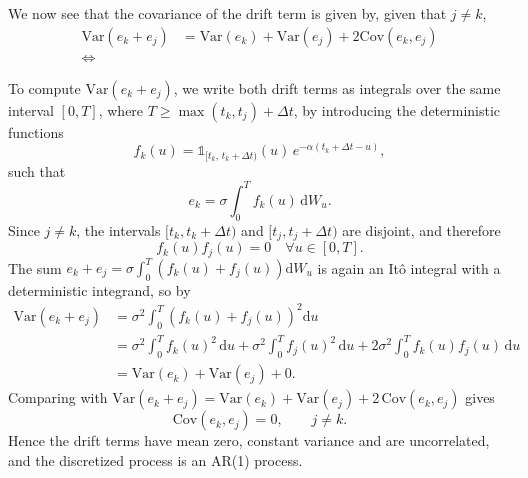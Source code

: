 We now see that the covariance of the drift term is given by, 
given that $j \neq k$,
\begin{equation}
\begin{aligned}
      \text{Var}(e_k + e_j) &= \text{Var}(e_k) +  \text{Var}(e_j) + 2\text{Cov}(e_k, e_j) \\
      \Leftrightarrow 
\end{aligned}
\end{equation}



To compute $\text{Var}(e_k + e_j)$, we write both drift terms as integrals over
the same interval $[0, T]$, where $T \geq \max(t_k, t_j) + \Delta t$, by
introducing the deterministic functions
\begin{equation}
    f_k(u) = \mathbb{1}_{[t_k,\, t_k + \Delta t)}(u)\, e^{-\alpha (t_k + \Delta t - u)},
\end{equation}
such that
\begin{equation}
    e_k = \sigma \int_0^T f_k(u) \, \mathrm{d}W_u .
\end{equation}
Since $j \neq k$, the intervals $[t_k, t_k + \Delta t)$ and $[t_j, t_j + \Delta t)$
are disjoint, and therefore
\begin{equation}
    f_k(u) f_j(u) = 0 \quad \forall u \in [0, T].
\end{equation}
The sum $e_k + e_j = \sigma \int_0^T \left(f_k(u) + f_j(u)\right) \mathrm{d}W_u$
is again an Itô integral with a deterministic integrand, so by
\textcite[Thm.~1.9.1]{iacus2008}
\begin{equation}
\begin{aligned}
    \text{Var}(e_k + e_j)
    &= \sigma^2 \int_0^T \left(f_k(u) + f_j(u)\right)^2 \mathrm{d}u \\
    &= \sigma^2 \int_0^T f_k(u)^2 \, \mathrm{d}u
     + \sigma^2 \int_0^T f_j(u)^2 \, \mathrm{d}u
     + 2\sigma^2 \int_0^T f_k(u) f_j(u) \, \mathrm{d}u \\
    &= \text{Var}(e_k) + \text{Var}(e_j) + 0 .
\end{aligned}
\end{equation}
Comparing with
$\text{Var}(e_k + e_j) = \text{Var}(e_k) + \text{Var}(e_j) + 2\,\text{Cov}(e_k, e_j)$
gives
\begin{equation}
    \text{Cov}(e_k, e_j) = 0, \qquad j \neq k .
\end{equation}
Hence the drift terms have mean zero, constant variance and are uncorrelated,
and the discretized process is an AR(1) process.
